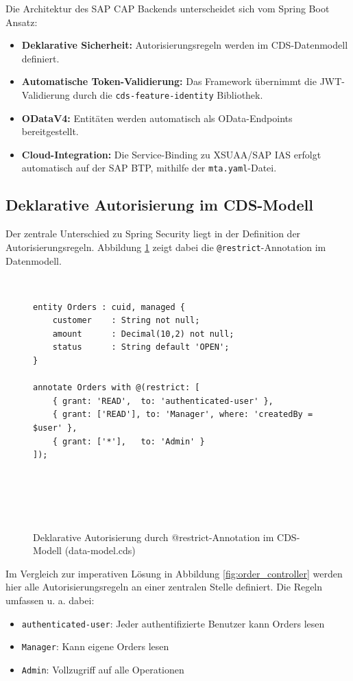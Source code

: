 Die Architektur des \ac{SAP CAP} Backends unterscheidet sich vom Spring Boot Ansatz:

\begin{itemize}
    \item \textbf{Deklarative Sicherheit:} Autorisierungsregeln werden im \ac{CDS}-Datenmodell definiert.
    \item \textbf{Automatische Token-Validierung:} Das Framework übernimmt die \ac{JWT}-Validierung durch die \texttt{cds-feature-identity} Bibliothek.
    \item \textbf{ODataV4:} Entitäten werden automatisch als OData-Endpoints bereitgestellt.
    \item \textbf{Cloud-Integration:} Die Service-Binding zu XSUAA/\ac{SAP IAS} erfolgt automatisch auf der \ac{SAP BTP}, mithilfe der \texttt{mta.yaml}-Datei.
\end{itemize}

\subsection{Deklarative Autorisierung im CDS-Modell}

Der zentrale Unterschied zu Spring Security liegt in der Definition der Autorisierungsregeln. Abbildung \ref{fig:cds_restrict} zeigt dabei die \texttt{@restrict}-Annotation im Datenmodell.

\begin{figure}[h]
    \begin{verbatim}
entity Orders : cuid, managed {
    customer    : String not null;
    amount      : Decimal(10,2) not null;
    status      : String default 'OPEN';
}

annotate Orders with @(restrict: [
    { grant: 'READ',  to: 'authenticated-user' },
    { grant: ['READ'], to: 'Manager', where: 'createdBy = $user' },
    { grant: ['*'],   to: 'Admin' }
]);
    \end{verbatim}
    \caption{Deklarative Autorisierung durch @restrict-Annotation im CDS-Modell (data-model.cds)}
    \label{fig:cds_restrict}
\end{figure}

Im Vergleich zur imperativen Lösung in Abbildung \ref{fig:order_controller} werden hier alle Autorisierungsregeln an einer zentralen Stelle definiert. Die Regeln umfassen u. a. dabei:
\begin{itemize}
    \item \texttt{authenticated-user}: Jeder authentifizierte Benutzer kann Orders lesen
    \item \texttt{Manager}: Kann eigene Orders lesen
    \item \texttt{Admin}: Vollzugriff auf alle Operationen
\end{itemize}

